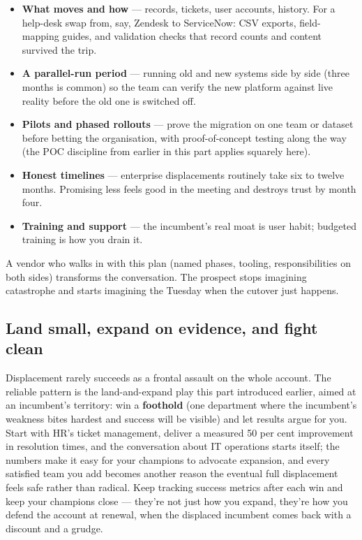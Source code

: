 \begin{itemize}[leftmargin=*]
\item \textbf{What moves and how} — records, tickets, user accounts, history. For a help-desk swap from, say, Zendesk to ServiceNow: CSV exports, field-mapping guides, and validation checks that record counts and content survived the trip.
\item \textbf{A parallel-run period} — running old and new systems side by side (three months is common) so the team can verify the new platform against live reality before the old one is switched off.
\item \textbf{Pilots and phased rollouts} — prove the migration on one team or dataset before betting the organisation, with proof-of-concept testing along the way (the POC discipline from earlier in this part applies squarely here).
\item \textbf{Honest timelines} — enterprise displacements routinely take six to twelve months. Promising less feels good in the meeting and destroys trust by month four.
\item \textbf{Training and support} — the incumbent's real moat is user habit; budgeted training is how you drain it.
\end{itemize}

A vendor who walks in with this plan (named phases, tooling, responsibilities on both sides) transforms the conversation. The prospect stops imagining catastrophe and starts imagining the Tuesday when the cutover just happens.



\subsection{Land small, expand on evidence, and fight clean}


Displacement rarely succeeds as a frontal assault on the whole account. The reliable pattern is the land-and-expand play this part introduced earlier, aimed at an incumbent's territory: win a \textbf{foothold} (one department where the incumbent's weakness bites hardest and success will be visible) and let results argue for you. Start with HR's ticket management, deliver a measured 50 per cent improvement in resolution times, and the conversation about IT operations starts itself; the numbers make it easy for your champions to advocate expansion, and every satisfied team you add becomes another reason the eventual full displacement feels safe rather than radical. Keep tracking success metrics after each win and keep your champions close — they're not just how you expand, they're how you defend the account at renewal, when the displaced incumbent comes back with a discount and a grudge.


